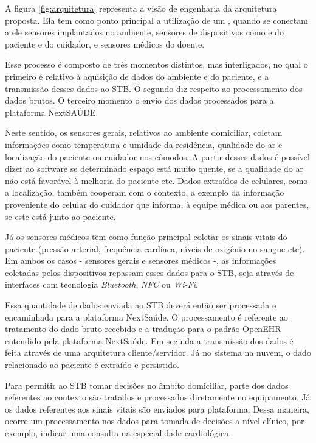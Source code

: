 A figura \ref{fig:arquitetura} representa a visão de engenharia da arquitetura
proposta. Ela tem como ponto principal a utilização de um \stb[], quando se
conectam a ele sensores  implantados no ambiente, sensores de dispositivos como
\smartphones[] e  \smartwatches[] do paciente e do cuidador, e sensores médicos
do doente.


Esse processo é composto de três momentos distintos, mas  interligados, no qual
o primeiro é relativo à aquisição de dados do ambiente e do paciente, e a
transmissão desses dados ao STB. O segundo diz respeito ao processamento dos
dados brutos. O terceiro momento o envio dos dados processados para a plataforma
NextSAÚDE.

Neste sentido, os sensores gerais, relativos ao ambiente domiciliar, coletam
informações como  temperatura e umidade da residência, qualidade do ar e
localização do paciente ou cuidador nos cômodos. A partir desses dados é
possível dizer ao software se determinado espaço está muito quente, se a
qualidade do ar não está favorável à melhoria do paciente etc. Dados extraídos
de celulares, como a localização, também cooperam com o contexto, a exemplo da
informação proveniente do celular do cuidador que informa, à equipe médica ou
aos parentes, se este está junto ao paciente.

Já os sensores médicos têm como função principal coletar os sinais vitais do
paciente (pressão arterial, frequência cardíaca, níveis de oxigênio no sangue
etc). Em ambos os casos - sensores gerais e sensores médicos -, as informações
coletadas pelos dispositivos repassam  esses dados para o STB, seja através de
interfaces com tecnologia  \textit{Bluetooth}, \textit{NFC} ou \textit{Wi-Fi}.

Essa quantidade de dados enviada ao STB deverá então ser processada e encaminhada
para a plataforma NextSaúde. O processamento é referente ao tratamento do dado
bruto recebido e a tradução para o padrão OpenEHR entendido pela plataforma
NextSaúde. Em seguida a transmissão dos dados é feita através de uma
arquitetura  cliente/servidor. Já no sistema na nuvem, o dado relacionado ao
paciente é extraído e persistido.

Para permitir ao STB tomar decisões no âmbito domiciliar, parte dos dados
referentes ao contexto são tratados e processados diretamente no equipamento.
Já os dados referentes aos sinais vitais são enviados para plataforma. Dessa 
maneira, ocorre um processamento nos dados para tomada de decisões a nível
clínico, por exemplo, indicar uma consulta na especialidade cardiológica.

